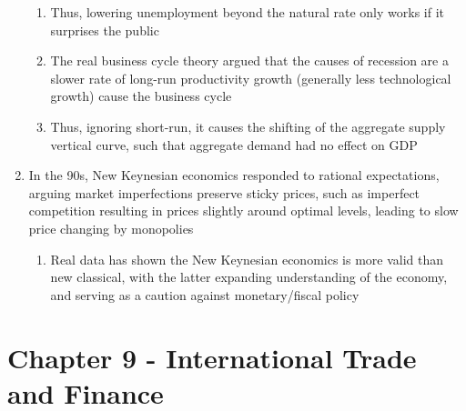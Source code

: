 \documentclass[11 pt, twoside]{article}
\begin{document}
\begin{enumerate}
\begin{enumerate}
\item Thus, lowering unemployment beyond the natural rate only works if it surprises the public
\item The real business cycle theory argued that the causes of recession are a slower rate of long-run productivity growth (generally less technological growth) cause the business cycle
\item Thus, ignoring short-run, it causes the shifting of the aggregate supply vertical curve, such that aggregate demand had no effect on GDP
\end{enumerate}
\item In the 90s, New Keynesian economics responded to rational expectations, arguing market imperfections preserve sticky prices, such as imperfect competition resulting in prices slightly around optimal levels, leading to slow price changing by monopolies
\begin{enumerate}
\item Real data has shown the New Keynesian economics is more valid than new classical, with the latter expanding understanding of the economy, and serving as a caution against monetary/fiscal policy
\end{enumerate}
\end{enumerate}

\section{Chapter 9 - International Trade and Finance}
\end{document}
